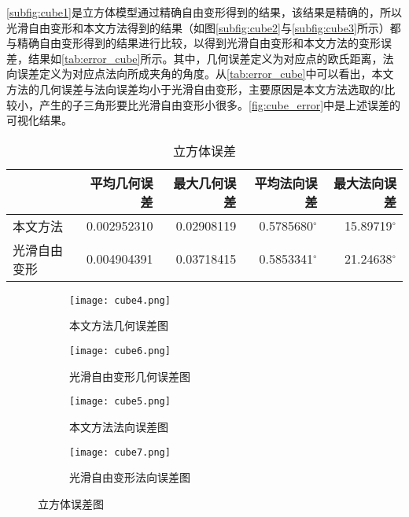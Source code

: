 \autoref{subfig:cube1}是立方体模型通过精确自由变形得到的结果，该结果是精确的，所以光滑自由变形和本文方法得到的结果（如图\autoref{subfig:cube2}与\autoref{subfig:cube3}所示）都与精确自由变形得到的结果进行比较，以得到光滑自由变形和本文方法的变形误差，结果如\autoref{tab:error_cube}所示。其中，几何误差定义为对应点的欧氏距离，法向误差定义为对应点法向所成夹角的角度。从\autoref{tab:error_cube}中可以看出，本文方法的几何误差与法向误差均小于光滑自由变形，主要原因是本文方法选取的$l$比较小，产生的子三角形要比光滑自由变形小很多。\autoref{fig:cube_error}中是上述误差的可视化结果。

\begin{table}[htbp]
    \centering
    \begin{tabular}{lrrrr}
    \toprule
                    & 平均几何误差 & 最大几何误差 & 平均法向误差 & 最大法向误差 \\
    \midrule
        本文方法    & \num{0.002952310} & \num{0.02908119} & \num[scientific-notation=false]{0.5785680}$^\circ$ & \num[scientific-notation=false]{15.89719}$^\circ$ \\
        光滑自由变形& \num{0.004904391} & \num{0.03718415} & \num[scientific-notation=false]{0.5853341}$^\circ$ & \num[scientific-notation=false]{21.24638}$^\circ$ \\
    \bottomrule
    \end{tabular}
    \caption{立方体误差} \label{tab:error_cube}
\end{table}

\begin{figure}[htbp]
	\centering
	\begin{subfigure}[b]{.4\textwidth}
		\centering
		\texttt{[image: cube4.png]}
		\caption{本文方法几何误差图}\label{subfig:cube4}
	\end{subfigure}
	\quad
	\begin{subfigure}[b]{.4\textwidth}
		\centering
		\texttt{[image: cube6.png]}
		\caption{光滑自由变形几何误差图}\label{subfig:cube6}
	\end{subfigure}
	\begin{subfigure}[b]{.4\textwidth}
		\centering
		\texttt{[image: cube5.png]}
		\caption{本文方法法向误差图}\label{subfig:cube5}
	\end{subfigure}
	\quad
	\begin{subfigure}[b]{.4\textwidth}
		\centering
		\texttt{[image: cube7.png]}
		\caption{光滑自由变形法向误差图}\label{subfig:cube7}
	\end{subfigure}
	\caption{立方体误差图}\label{fig:cube_error}
\end{figure}

